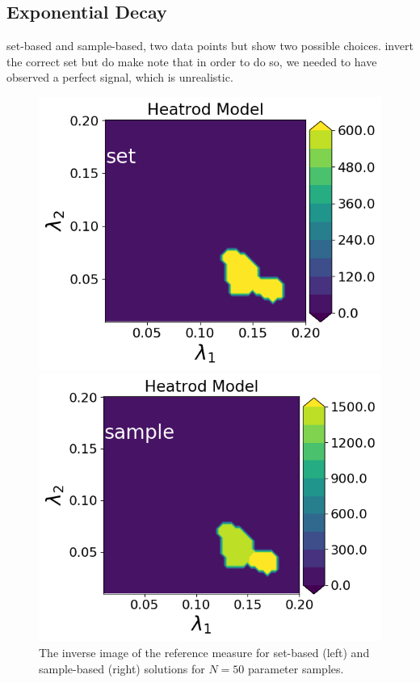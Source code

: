 \subsection{Exponential Decay}\label{ex:decay-set-sample}

set-based and sample-based, two data points but show two possible choices.
invert the correct set but do make note that in order to do so, we needed to have observed a perfect signal, which is unrealistic.


\begin{figure}[h]
\begin{minipage}{.475\textwidth}
\includegraphics[width=\linewidth]{examples/fig_heatrod_q1/HeatrodModel--set_N50_em.png}
\end{minipage}
\begin{minipage}{.475\textwidth}
\includegraphics[width=\linewidth]{examples/fig_heatrod_q1/HeatrodModel--sample_N50_mc.png}
\end{minipage}
\caption{The inverse image of the reference measure for set-based (left) and sample-based (right) solutions for $N=50$ parameter samples.}
\label{fig:heatrod-sol-ex}
\end{figure}
